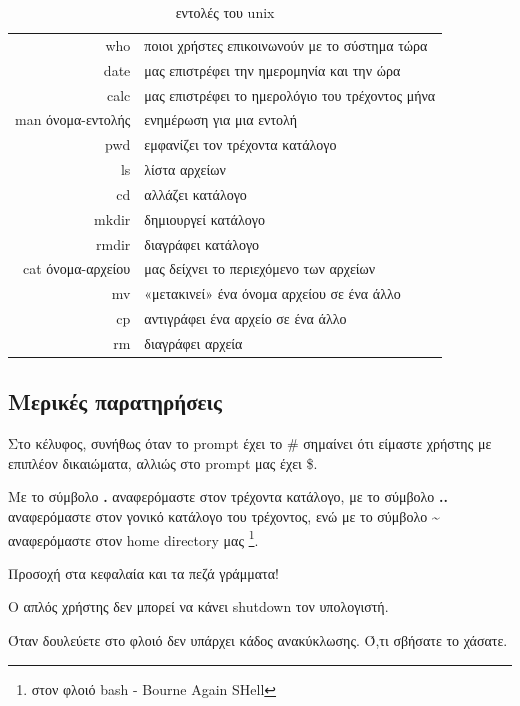 \begin{center}
\begin{table}[h]
\begin{tabular}{ r | l }
who  & ποιοι χρήστες επικοινωνούν με το σύστημα τώρα  \\
date & μας επιστρέφει την ημερομηνία και την ώρα  \\
calc & μας επιστρέφει το ημερολόγιο του τρέχοντος μήνα \\
man όνομα-εντολής & ενημέρωση για μια εντολή \\  
pwd  & εμφανίζει τον τρέχοντα κατάλογο \\
ls & λίστα αρχείων \\
cd   & αλλάζει κατάλογο \\  
mkdir & δημιουργεί κατάλογο \\
rmdir & διαγράφει κατάλογο \\  
cat όνομα-αρχείου & μας δείχνει το περιεχόμενο των αρχείων \\
mv & «μετακινεί» ένα όνομα αρχείου σε ένα άλλο \\
cp & αντιγράφει ένα αρχείο σε ένα άλλο \\
rm & διαγράφει αρχεία \\
\end{tabular}  
\caption{εντολές του unix} 
\label{tab:cmd}          
\end{table}
\end{center}


\subsection{Μερικές παρατηρήσεις}


\begin{packed_item}
  \item Στο κέλυφος, συνήθως όταν το prompt έχει το \# σημαίνει ότι είμαστε χρήστης με επιπλέον δικαιώματα, αλλιώς στο prompt μας έχει \$.
  \item Με το σύμβολο \textbf{.} αναφερόμαστε στον τρέχοντα κατάλογο, με το σύμβολο \textbf{..} αναφερόμαστε στον γονικό κατάλογο του τρέχοντος, ενώ με το σύμβολο \space \textbf{\textasciitilde} \space αναφερόμαστε στον home directory μας \footnote{στον φλοιό bash - Bourne Again SHell }. 
  \item Προσοχή στα κεφαλαία και τα πεζά γράμματα!   
  \item Ο απλός χρήστης δεν μπορεί να κάνει shutdown τον υπολογιστή.
  \item Όταν δουλεύετε στο φλοιό δεν υπάρχει κάδος ανακύκλωσης. Ό,τι σβήσατε το χάσατε.                    
\end{packed_item}


